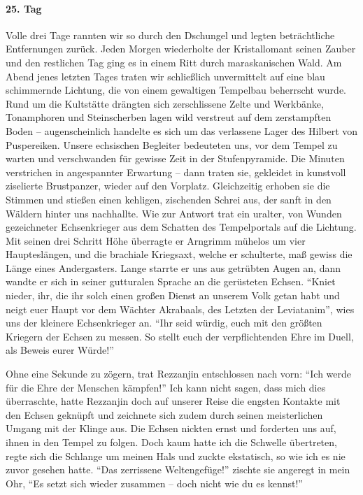 \paragraph{25. Tag}
Volle drei Tage rannten wir so durch den Dschungel und legten beträchtliche Entfernungen zurück. Jeden Morgen wiederholte der Kristallomant seinen Zauber und den restlichen Tag ging es in einem Ritt durch maraskanischen Wald. Am Abend jenes letzten Tages traten wir schließlich unvermittelt auf eine blau schimmernde Lichtung, die von einem gewaltigen Tempelbau beherrscht wurde. Rund um die Kultstätte drängten sich zerschlissene Zelte und Werkbänke, Tonamphoren und Steinscherben lagen wild verstreut auf dem zerstampften Boden -- augenscheinlich handelte es sich um das verlassene Lager des Hilbert von Puspereiken. Unsere echsischen Begleiter bedeuteten uns, vor dem Tempel zu warten und verschwanden für gewisse Zeit in der Stufenpyramide. Die Minuten verstrichen in angespannter Erwartung -- dann traten sie, gekleidet in kunstvoll ziselierte Brustpanzer, wieder auf den Vorplatz. Gleichzeitig erhoben sie die Stimmen und stießen einen kehligen, zischenden Schrei aus, der sanft in den Wäldern hinter uns nachhallte. Wie zur Antwort trat ein uralter, von Wunden gezeichneter Echsenkrieger aus dem Schatten des Tempelportals auf die Lichtung. Mit seinen drei Schritt Höhe überragte er Arngrimm mühelos um vier Haupteslängen, und die brachiale Kriegsaxt, welche er schulterte, maß gewiss die Länge eines Andergasters. Lange starrte er uns aus getrübten Augen an, dann wandte er sich in seiner gutturalen Sprache an die gerüsteten Echsen. ``Kniet nieder, ihr, die ihr solch einen großen Dienst an unserem Volk getan habt und neigt euer Haupt vor dem Wächter Akrabaals, des Letzten der Leviatanim'', wies uns der kleinere Echsenkrieger an. ``Ihr seid würdig, euch mit den größten Kriegern der Echsen zu messen. So stellt euch der verpflichtenden Ehre im Duell, als Beweis eurer Würde!''

Ohne eine Sekunde zu zögern, trat Rezzanjin entschlossen nach vorn: ``Ich werde für die Ehre der Menschen kämpfen!'' Ich kann nicht sagen, dass mich dies überraschte, hatte Rezzanjin doch auf unserer Reise die engsten Kontakte mit den Echsen geknüpft und zeichnete sich zudem durch seinen meisterlichen Umgang mit der Klinge aus. Die Echsen nickten ernst und forderten uns auf, ihnen in den Tempel zu folgen. Doch kaum hatte ich die Schwelle übertreten, regte sich die Schlange um meinen Hals und zuckte ekstatisch, so wie ich es nie zuvor gesehen hatte. ``Das zerrissene Weltengefüge!'' zischte sie angeregt in mein Ohr, ``Es setzt sich wieder zusammen -- doch nicht wie du es kennst!'' 

